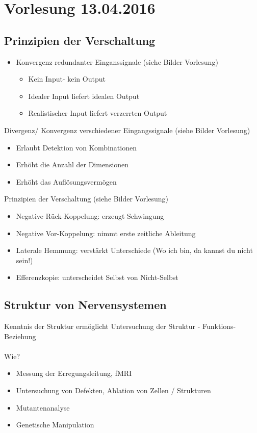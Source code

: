 \section{Vorlesung 13.04.2016}

\subsection{Prinzipien der Verschaltung}
\begin{itemize}
	\item Konvergenz redundanter Einganssignale (siehe Bilder Vorlesung)
		\begin{itemize}
			\item Kein Input- kein Output
			\item Idealer Input liefert idealen Output
			\item Realistischer Input liefert verzerrten Output
	\end{itemize}
\end{itemize}

Divergenz/ Konvergenz verschiedener Eingangssignale (siehe Bilder Vorlesung)
\begin{itemize}
	\item Erlaubt Detektion von Kombinationen
	\item Erhöht die Anzahl der Dimensionen
	\item Erhöht das Auflösungsvermögen
\end{itemize}

Prinzipien der Verschaltung (siehe Bilder Vorlesung)
\begin{itemize}
	\item Negative Rück-Koppelung: erzeugt Schwingung
	\item Negative Vor-Koppelung: nimmt erste zeitliche Ableitung
	\item Laterale Hemmung: verstärkt Unterschiede (Wo ich bin, da kannst du nicht sein!)
	\item Efferenzkopie: unterscheidet Selbst von Nicht-Selbst
\end{itemize}

\subsection{Struktur von Nervensystemen}
Kenntnis der Struktur ermöglicht Untersuchung der Struktur - Funktions-Beziehung
\\\\
Wie?
\begin{itemize}
	\item Messung der Erregungsleitung, fMRI
	\item Untersuchung von Defekten, Ablation von Zellen / Strukturen
	\item Mutantenanalyse
	\item Genetische Manipulation
\end{itemize}

